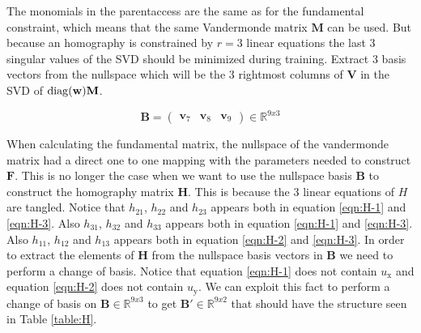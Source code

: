 The monomials in the parentaccess are the same as for the fundamental constraint, which means that the same Vandermonde matrix $\textbf{M}$ can be used. But because an homography is constrained by $r=3$ linear equations the last 3 singular values of the SVD should be minimized during training. Extract 3 basis vectors from the nullspace which will be the 3 rightmost columns of $\textbf{V}$ in the SVD of $\operatorname{diag}(\textbf{w})\textbf{M}$.

\begin{equation}
\mathbf{B} = 
\begin{pmatrix}
\textbf{v}_7 & \textbf{v}_8 & \textbf{v}_9
\end{pmatrix}
\in \mathbb{R}^{9x3}
\end{equation}

When calculating the fundamental matrix, the nullspace of the vandermonde matrix had a direct one to one mapping with the parameters needed to construct $\textbf{F}$. This is no longer the case when we want to use the nullspace basis $\textbf{B}$ to construct the homography matrix $\textbf{H}$. This is because the 3 linear equations of $H$ are tangled. Notice that $h_{21}$, $h_{22}$ and $h_{23}$ appears both in equation \ref{eqn:H-1} and \ref{eqn:H-3}. Also $h_{31}$, $h_{32}$ and $h_{33}$ appears both in equation \ref{eqn:H-1} and \ref{eqn:H-3}. Also $h_{11}$, $h_{12}$ and $h_{13}$ appears both in equation \ref{eqn:H-2} and \ref{eqn:H-3}. In order to extract the elements of $\textbf{H}$ from the nullspace basis vectors in $\textbf{B}$ we need to perform a change of basis.
Notice that equation \ref{eqn:H-1} does not contain $u_\mathrm{x}$ and equation \ref{eqn:H-2} does not contain $u_\mathrm{y}$. We can exploit this fact to perform a change of basis on $\textbf{B} \in \mathbb{R}^{9x3}$ to get $\textbf{B}' \in \mathbb{R}^{9x2}$ that should have the structure seen in Table \ref{table:H}.

